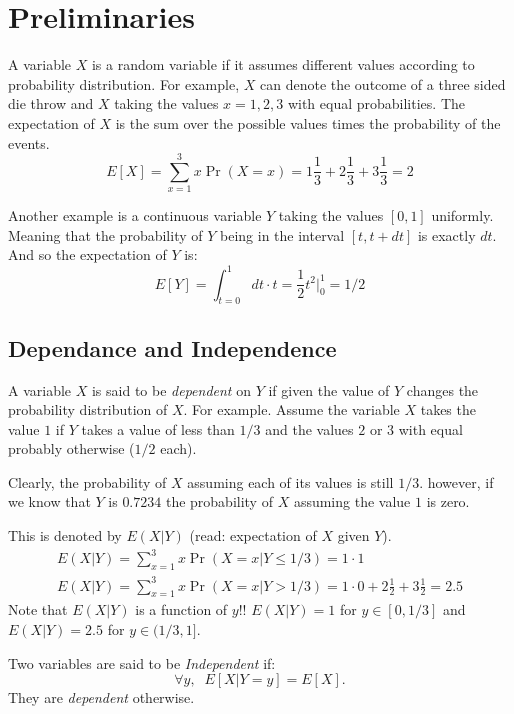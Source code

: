 \documentclass{article}
\begin{document}


\section{Preliminaries}
A variable $X$ is a random variable if it assumes different values
according to probability distribution. For example, $X$ can 
denote the outcome of a three sided die throw and $X$ taking the values $x
= 1,2,3$ with equal probabilities. The
expectation of $X$ is the sum over the possible values times the
probability of the events.
\begin{equation}
E[X] = \sum_{x=1}^{3}x \Pr(X = x)=
1\frac{1}{3}+2\frac{1}{3}+3\frac{1}{3} = 2
\end{equation}

Another example is a continuous variable $Y$ taking the values
$[0,1]$ uniformly. Meaning that the probability of $Y$ being in the
interval $[t,t + dt]$ is exactly $dt$. And so the expectation of $Y$
is:
\begin{equation}
E[Y] = \int_{t=0}^{1}dt \cdot t = \frac{1}{2}t^2|_{0}^{1} = 1/2
\end{equation}


\subsection{Dependance and Independence}
A variable $X$ is said to be {\it dependent} on $Y$ if given the
value of $Y$ changes the probability distribution of $X$. For
example. Assume the variable $X$ takes the value $1$ if $Y$ takes a
value of less than $1/3$ and the values $2$ or $3$ with equal
probably otherwise ($1/2$ each).

Clearly, the probability of $X$ assuming each of its values is still
$1/3$. however, if we know that $Y$ is $0.7234$ the probability of
$X$ assuming the value $1$ is zero.

This is denoted by $E(X | Y)$ (read: expectation of $X$ given $Y$).
\begin{eqnarray}
E(X | Y) = \sum_{x=1}^{3} x \Pr(X = x | Y \le 1/3) = 1\cdot 1\\
E(X | Y) = \sum_{x=1}^{3} x \Pr(X = x | Y > 1/3) = 1\cdot 0 + 2
\frac{1}{2} + 3\frac{1}{2}  = 2.5
\end{eqnarray}
Note that $E(X | Y)$ is a function of $y$!! $E(X | Y) = 1$ for $y
\in [0,1/3]$ and $E(X | Y) = 2.5$ for $y \in (1/3,1]$.

\begin{definition}
Two variables are said to be {\it Independent} if:
\[
\forall y,\;\;E[ X | Y = y] = E[X].
\]
They are {\it dependent} otherwise.
\end{definition}
\end{document}
